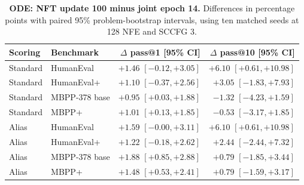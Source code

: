\documentclass[11pt,letterpaper]{article}
\begin{document}
\begin{table}[htbp]
\centering\small
\setlength{\tabcolsep}{3pt}
\caption{\textbf{ODE: NFT update 100 minus joint epoch 14.} Differences in percentage points with paired 95\% problem-bootstrap intervals, using ten matched seeds at 128 NFE and SCCFG 3.}
\label{tab:codingnftdeltas}
\begin{tabular}{@{}llrr@{}}
\toprule
Scoring & Benchmark & $\Delta$ pass@1 [95\% CI] & $\Delta$ pass@10 [95\% CI]\\
\midrule
Standard & HumanEval & $+1.46$ {\scriptsize $[-0.12,+3.05]$} & $+6.10$ {\scriptsize $[+0.61,+10.98]$}\\
Standard & HumanEval+ & $+1.10$ {\scriptsize $[-0.37,+2.56]$} & $+3.05$ {\scriptsize $[-1.83,+7.93]$}\\
Standard & MBPP-378 base & $+0.95$ {\scriptsize $[+0.03,+1.88]$} & $-1.32$ {\scriptsize $[-4.23,+1.59]$}\\
Standard & MBPP+ & $+1.01$ {\scriptsize $[+0.13,+1.85]$} & $-0.53$ {\scriptsize $[-3.17,+1.85]$}\\
\midrule
Alias & HumanEval & $+1.59$ {\scriptsize $[-0.00,+3.11]$} & $+6.10$ {\scriptsize $[+0.61,+10.98]$}\\
Alias & HumanEval+ & $+1.22$ {\scriptsize $[-0.18,+2.62]$} & $+2.44$ {\scriptsize $[-2.44,+7.32]$}\\
Alias & MBPP-378 base & $+1.88$ {\scriptsize $[+0.85,+2.88]$} & $+0.79$ {\scriptsize $[-1.85,+3.44]$}\\
Alias & MBPP+ & $+1.48$ {\scriptsize $[+0.53,+2.41]$} & $+0.79$ {\scriptsize $[-1.59,+3.17]$}\\
\bottomrule
\end{tabular}
\end{table}
\end{document}
